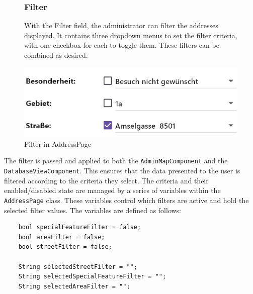 \newpage


\begin{figure}[H]
    \centering
    \begin{minipage}{0.55\textwidth} %
        \subsubsection{Filter}
        With the Filter field, the administrator can filter the addresses displayed. It contains three dropdown menus to set the filter criteria, with one checkbox for each to toggle them. These filters can be combined as desired. 
    \end{minipage}
    \hfill 
    \begin{minipage}{0.4\textwidth} %
        \centering
        \includegraphics[width=\linewidth]{images/AdminPanel/FilterField.png}
        \caption{Filter in AddressPage}
        \label{fig:adminpanel_filter}
    \end{minipage}
\end{figure}

The filter is passed and applied to both the \texttt{AdminMapComponent} and the \texttt{DatabaseViewComponent}. This ensures that the data presented to the user is filtered according to the criteria they select. The criteria and their enabled/disabled state are managed by a series of variables within the \texttt{AddressPage} class. These variables control which filters are active and hold the selected filter values. The variables are defined as follows:

\lstset{style=mycsharp, caption=Filter variables in AddressPage}
\begin{lstlisting}
    bool specialFeatureFilter = false;
    bool areaFilter = false;
    bool streetFilter = false;
    
    String selectedStreetFilter = "";
    String selectedSpecialFeatureFilter = "";
    String selectedAreaFilter = "";
\end{lstlisting}



